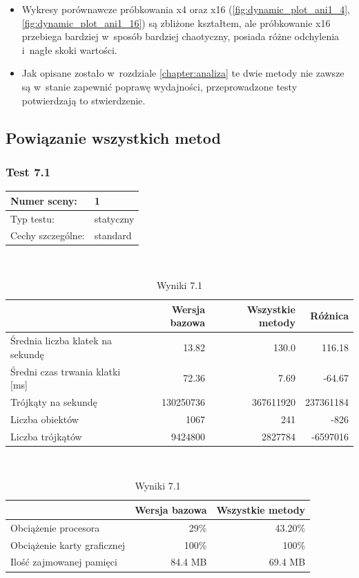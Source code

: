 \documentclass[a4paper,twoside,12pt]{book}
\begin{document}
\begin{itemize}
    \item Wykresy porównawcze próbkowania x4 oraz x16 (\ref{fig:dynamic_plot_ani1_4}, \ref{fig:dynamic_plot_ani1_16}) są zbliżone kształtem, ale próbkowanie x16 przebiega bardziej w~sposób bardziej chaotyczny, posiada różne odchylenia i~nagłe skoki wartości.
    \item Jak opisane zostało w~rozdziale \ref{chapter:analiza} te dwie metody nie zawsze są w~stanie zapewnić poprawę wydajności, przeprowadzone testy potwierdzają to stwierdzenie.
\end{itemize}


\subsection{Powiązanie wszystkich metod}
\subsubsection{Test 7.1}
\begin{tabular}{|l||l|}
\hline
Numer sceny: & 1 \\
\hline
Typ testu: & statyczny \\
\hline
Cechy szczególne: & standard \\
\hline
\end{tabular}\\

\begin{table}[H]
    \centering
    \caption{Wyniki 7.1}
    \label{tab:all_test1}
    \begin{tabular}{|l||r|r|r|}
        \hline
        & Wersja bazowa & Wszystkie metody & Różnica \\
        \hline
        Średnia liczba klatek na sekundę & 13.82 & 130.0 & 116.18 \\
        \hline
        Średni czas trwania klatki [ms] & 72.36 & 7.69 & -64.67 \\
        \hline
        Trójkąty na sekundę & 130250736 & 367611920 & 237361184 \\
        \hline
        Liczba obiektów & 1067 & 241 & -826 \\
        \hline
        Liczba trójkątów & 9424800 & 2827784 & -6597016 \\
        \hline
    \end{tabular} \\
    
    \vspace*{0.5 cm}
    
    \begin{tabular}{|l||r|r|}
         \hline
        & Wersja bazowa & Wszystkie metody \\
         \hline
        Obciążenie procesora & 29\% & 43.20\% \\
        \hline
        Obciążenie karty graficznej & 100\% & 100\% \\
        \hline
        Ilość zajmowanej pamięci & 84.4 MB & 69.4 MB \\
        \hline
    \end{tabular}
\end{table}
\end{document}
